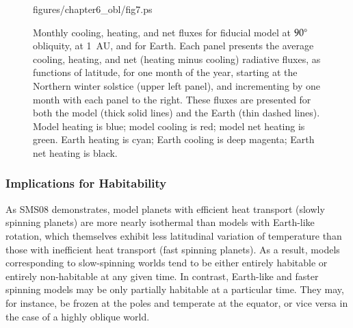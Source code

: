 \afterpage{\clearpage}

\begin{figure}[p]
\plotone
{figures/chapter6_obl/fig7.ps}
\caption[Monthly cooling, heating, and net fluxes for fiducial model
at $90\degr$ obliquity, at 1~AU, and for Earth.]{Monthly cooling,
heating, and net fluxes for fiducial model at $90\degr$ obliquity, at
1~AU, and for Earth.  Each panel presents the average cooling,
heating, and net (heating minus cooling) radiative fluxes, as
functions of latitude, for one month of the year, starting at the
Northern winter solstice (upper left panel), and incrementing by one
month with each panel to the right.  These fluxes are presented for
both the model (thick solid lines) and the Earth (thin dashed lines).
Model heating is blue; model cooling is red; model net heating is
green.  Earth heating is cyan; Earth cooling is deep magenta; Earth
net heating is black.}
\label{obl_fig:set30heat_cool_monthly90}
\end{figure}

\afterpage{\clearpage}

\subsubsection{Implications for Habitability}
\label{obl_sssec:hab}

As SMS08 demonstrates, model planets with efficient heat transport
(slowly spinning planets) are more nearly isothermal than models with
Earth-like rotation, which themselves exhibit less latitudinal
variation of temperature than those with inefficient heat transport
(fast spinning planets).  As a result, models corresponding to
slow-spinning worlds tend to be either entirely habitable or entirely
non-habitable at any given time.  In contrast, Earth-like and faster
spinning models may be only partially habitable at a particular time.
They may, for instance, be frozen at the poles and temperate at the
equator, or vice versa in the case of a highly oblique world.

